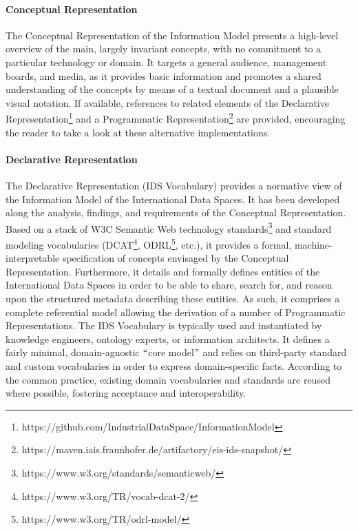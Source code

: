 \paragraph{Conceptual Representation \\}
The Conceptual Representation of the Information Model presents a high-level overview of the main, largely invariant concepts, with no commitment to a particular technology or domain. It targets a general audience, management boards, and media, as it provides basic information and promotes a shared understanding of the concepts by means of a textual document and a plausible visual notation. If available, references to related elements of the Declarative Representation\footnote{https://github.com/IndustrialDataSpace/InformationModel } and a Programmatic Representation\footnote{https://maven.iais.fraunhofer.de/artifactory/eis-ids-snapshot/ } are provided, encouraging the reader to take a look at these alternative implementations.

\paragraph{Declarative Representation\\}
The Declarative Representation (IDS Vocabulary) provides a normative view of the Information Model of the International Data Spaces. It has been developed along the analysis, findings, and requirements of the Conceptual Representation. Based on a stack of W3C Semantic Web technology standards\footnote{https://www.w3.org/standards/semanticweb/ } and standard modeling vocabularies (DCAT\footnote{https://www.w3.org/TR/vocab-dcat-2/ }, ODRL\footnote{https://www.w3.org/TR/odrl-model/ }, etc.), it provides a formal, machine-interpretable specification of concepts envisaged by the Conceptual Representation. Furthermore, it details and formally defines entities of the International Data Spaces in order to be able to share, search for, and reason upon the structured metadata describing these entities. As such, it comprises a complete referential model allowing the derivation of a number of Programmatic Representations. The IDS Vocabulary is typically used and instantiated by knowledge engineers, ontology experts, or information architects. It defines a fairly minimal, domain-agnostic $``$core model$"$  and relies on third-party standard and custom vocabularies in order to express domain-specific facts. According to the common practice, existing domain vocabularies and standards are reused where possible, fostering acceptance and interoperability.


